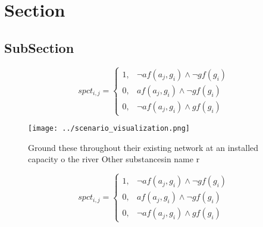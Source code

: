 \documentclass[a4paper]{article}
\begin{document}
\section{Section}

\subsection{SubSection}

\begin{equation}
spct_{i,j} =
\begin{cases}
1, & \text{$\neg af(a_j,g_i) \wedge \neg gf(g_i)$}\\
0, & \text{$af(a_j,g_i) \wedge \neg gf(g_i)$}\\
0, & \text{$\neg af(a_j,g_i) \wedge gf(g_i)$}
\end{cases}
\end{equation}

\begin{figure}
\centering
\texttt{[image: ../scenario\_visualization.png]}
\caption{Ground these throughout their existing network at an installed capacity o the river Other substancesin name r
}
\end{figure}
 
\begin{equation}
spct_{i,j} =
\begin{cases}
1, & \text{$\neg af(a_j,g_i) \wedge \neg gf(g_i)$}\\
0, & \text{$af(a_j,g_i) \wedge \neg gf(g_i)$}\\
0, & \text{$\neg af(a_j,g_i) \wedge gf(g_i)$}
\end{cases}
\end{equation}
\end{document}
